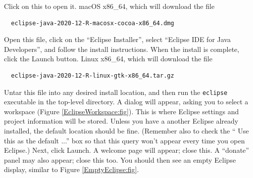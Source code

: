 Click on this to open it. 
\fi
\ifMacOS
{\sf macOS x86\_64}, which will download the file
\begin{verbatim}
  eclipse-java-2020-12-R-macosx-cocoa-x86_64.dmg
\end{verbatim}
Open this file, click on the ``Eclipse Installer'',
select ``Eclipse IDE for Java Developers'', and follow
the install instructions. When the install is complete,
click the {\sf Launch} button.
\fi
\ifLinux
{\sf Linux x86\_64}, which will download the file
\begin{verbatim}
  eclipse-java-2020-12-R-linux-gtk-x86_64.tar.gz
\end{verbatim}
Untar this file into any desired install location,
and then run the {\tt eclipse} executable in the
top-level directory.
\fi
A dialog will appear, asking you to select a workspace \directory{}
(Figure \ref{EclipseWorkspace:fig}).
This is where Eclipse settings and project information will be
stored. Unless you have a another Eclipse already installed, the
default location should be fine. (Remember also to check the ``{\sf
Use this as the default ...}''  box so that this query won't appear
every time you open Eclipse.) 
Next, click {\sf Launch}.  A welcome
page will appear; close this. A ``donate'' panel may also appear;
close this too.  You should then see an empty Eclipse display, similar
to Figure \ref{EmptyEclipse:fig}.

